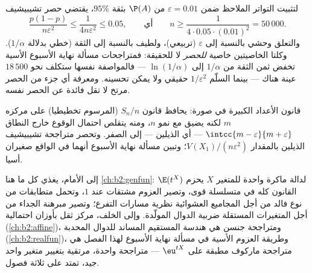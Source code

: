 \begin{example}\label{ex:b2:randomvar:llnnumeric}
لتثبيت التواتر الملاحظ ضمن $\varepsilon = 0.01$ من $\P(A)$ بثقة $95\%$، يقتضي حصر
تشيبيشيف
\[
\frac{p(1-p)}{n\varepsilon^2} \leq \frac{1}{4n\varepsilon^2}
\leq 0.05,
\qquad\text{أي}\qquad
n \geq \frac{1}{4\cdot0.05\cdot(0.01)^2} = 50\,000 .
\]
والتعلق وحشي بالنسبة إلى $\varepsilon$ (تربيعي)، ولطيف بالنسبة إلى الثقة
(خطي بدلالة $1/\alpha$). وكلتا الخاصيتين خاصية \emph{للحصر} لا للحقيقة:
فمتراجحات مسألة نهاية الأسبوع الأسية تخفض ثمن الثقة من $1/\alpha$ إلى
$\ln(1/\alpha)$ --- فالمواصفة نفسها ستكلف نحو $18\,500$ عينة هناك --- بينما
السلّم $1/\varepsilon^2$ حقيقي ولا يمكن تحسينه. ومعرفة أي جزء من الحصر مرتخ
لا تقل فائدة عن الحصر نفسه.
\end{example}

\begin{omfigure}

{\small قانون الأعداد الكبيرة في صورة: يحافظ قانون $S_n/n$ (المرسوم
تخطيطيا) على مركزه $m$ لكنه يضيق مع نمو $n$، ومنه يتقلص
احتمال الوقوع خارج النطاق $\intcc{m-\varepsilon}{m+\varepsilon}$ --- أي الذيلين --- إلى الصفر.
وتحصر متراجحة تشيبيشيف الذيلين بالمقدار $V(X_1)/(n\varepsilon^2)$؛ وتبين مسألة نهاية
الأسبوع أنهما في الواقع صغيران أسيا.}
\end{omfigure}

\begin{remark}
إلى الأمام، يغذي كل ما هنا \cref{ch:b2:genfun}:  $\E(t^X)$ لدالة
ماكرة واحدة للمتغير $X$ يحزم القانون كله في متسلسلة قوى، وتصير
العزوم مشتقات عند $1$، وتحمل متطابقات من نوع فالد من أجل المجاميع
العشوائية نظرية مسارات التفرع؛ وتصير مبرهنة الجداء من أجل المتغيرات
المستقلة ضربية الدوال المولّدة. وإلى الخلف،  مركز ثقل
بأوزان احتمالية (\cref{ch:b2:affine})، ومتراجحة جنسن هي هندسة المستقيم المساند
للدوال المحدبة (\cref{ch:b2:realfun})، وطريقة العزوم الأسية في مسألة نهاية الأسبوع
لهذا الفصل هي متراجحة ماركوف مطبقة على $\eu^{tX}$ --- متراجحة واحدة،
مرتقية بتغيير متغير واحد جيد، تمتد على ثلاثة فصول.
\end{remark}


